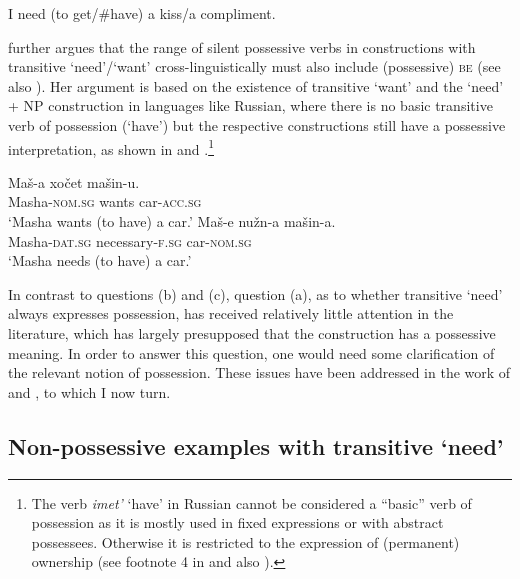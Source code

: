 \documentclass[output=paper,colorlinks,citecolor=brown]{langscibook}
\begin{document}
\ea\label{get} I need (to get/\#have) a kiss/a compliment.\hfill \citep[215]{Harves2008}\label{need-get}
\z

\noindent \citet{Harves2008} further argues that the range of silent possessive verbs in constructions with transitive `need'/`want' cross-linguistically must also include (possessive) \textsc{be} (see also \citealt{Harves.Kayne2012}). Her argument is based on the existence of transitive `want' and the `need' + NP construction in languages like Russian, where there is no basic transitive verb of possession (`have') but the respective constructions still have a possessive interpretation, as shown in  and .\footnote{\label{footnote-imet}The verb \textit{imet'} `have' in Russian cannot be considered a ``basic'' verb of possession as it is mostly used in fixed expressions or with abstract possessees. Otherwise it is restricted to the expression of (permanent) ownership (see footnote 4 in \citealt{Harves.Kayne2012} and also \citealt[440ff.]{Stolz.Kettler.Stroh.Urdze2008}).}

\ea
\ea \gll Maš-a xočet mašin-u.\label{xotet}\\
Masha-\textsc{nom.sg} wants car-\textsc{acc.sg}\\
\glt `Masha wants (to have) a car.'
\ex \gll Maš-e nužn-a mašin-a.\label{nuzhen}\\
Masha-\textsc{dat.sg} necessary-\textsc{f.sg} car-\textsc{nom.sg}\\
\glt `Masha needs (to have) a car.'
\z\z

\noindent In contrast to questions (b) and (c), question (a), as to whether transitive `need' always expresses possession, has received relatively little attention in the literature, which has largely presupposed that the construction has a possessive meaning. In order to answer this question, one would need some clarification of the relevant notion of possession. These issues have been addressed in the work of \citet{Schwarz2006} and \citet{Zaroukian.Beller2013}, to which I now turn.

\subsection{Non-possessive examples with transitive `need'}\label{section-problematic}
\end{document}
